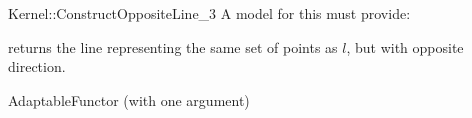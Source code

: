 \begin{ccRefFunctionObjectConcept}{Kernel::ConstructOppositeLine_3}
A model for this must provide:


{returns the line representing the same set of points as $l$,
but with opposite direction.}

\ccRefines
AdaptableFunctor (with one argument)

\ccSeeAlso
{} \\

\end{ccRefFunctionObjectConcept}
